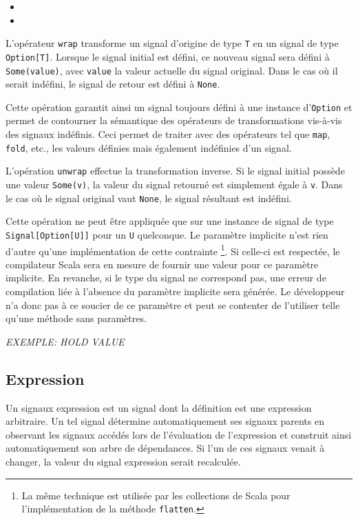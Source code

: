 \begin{itemize}
	\item {}
	\item {}
\end{itemize}

L'opérateur \texttt{wrap} transforme un signal d'origine de type \texttt{T} en un signal de type \texttt{Option[T]}. Lorsque le signal initial est défini, ce nouveau signal sera défini à \texttt{Some(value)}, avec \texttt{value} la valeur actuelle du signal original. Dans le cas où il serait indéfini, le signal de retour est défini à \texttt{None}.

Cette opération garantit ainsi un signal toujours défini à une instance d'\texttt{Option} et permet de contourner la sémantique des opérateurs de transformations vis-à-vis des signaux indéfinis. Ceci permet de traiter avec des opérateurs tel que \texttt{map}, \texttt{fold}, etc., les valeurs définies mais également indéfinies d'un signal.

L'opération \texttt{unwrap} effectue la transformation inverse. Si le signal initial possède une valeur \texttt{Some(v)}, la valeur du signal retourné est simplement égale à \texttt{v}. Dans le cas où le signal original vaut \texttt{None}, le signal résultant est indéfini.

Cette opération ne peut être appliquée que sur une instance de signal de type \texttt{Signal[Option[U]]} pour un \texttt{U} quelconque. Le paramètre implicite n'est rien d'autre qu'une implémentation de cette contrainte \footnote{La même technique est utilisée par les collections de Scala pour l'implémentation de la méthode \texttt{flatten}.}. Si celle-ci est respectée, le compilateur Scala sera en mesure de fournir une valeur pour ce paramètre implicite. En revanche, si le type du signal ne correspond pas, une erreur de compilation liée à l'absence du paramètre implicite sera générée. Le développeur n'a donc pas à ce soucier de ce paramètre et peut se contenter de l'utiliser telle qu'une méthode sans paramètres.

\textit{EXEMPLE: HOLD VALUE}

\subsection{Expression}
\label{sec:sig-expr}

Un signaux expression est un signal dont la définition est une expression arbitraire. Un tel signal détermine automatiquement ses signaux parents en observant les signaux accédés lors de l'évaluation de l'expression et construit ainsi automatiquement son arbre de dépendances. Si l'un de ces signaux venait à changer, la valeur du signal expression serait recalculée.

